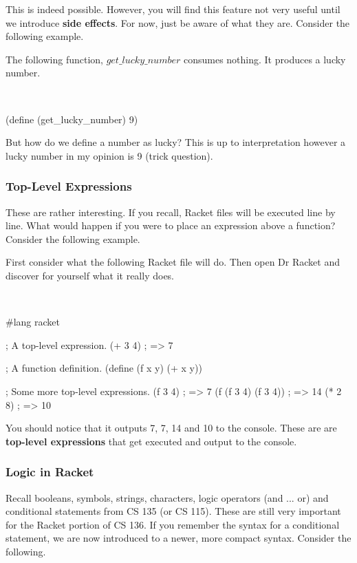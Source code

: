 \documentclass[11pt, twoside, exarticle]{article}
\newcommand{\exbox}[2] {
	\setlength{\fboxsep}{8pt}
	\marginpar {
		\vspace{0.9em}
		\footnotesize{\textbf{\color{darkpurple}EXAMPLE #1}}
	}
	\colorbox{lightpurple}{
		\begin{varwidth}{\dimexpr\linewidth-2\fboxsep}
		#2
		\end{varwidth}
	}
	~\\
}
\begin{document}
This is indeed possible. However, you will find this feature not very useful until we introduce \textbf{side effects}. For now, just be aware of what they are. Consider the following example.\\

\exbox{3}{The following function, $get\_lucky\_number$ consumes nothing. It produces a lucky number.}

\begin{code}[Lisp]
(define (get_lucky_number)
	9)
\end{code}

But how do we define a number as lucky? This is up to interpretation however a lucky number in my opinion is 9 (trick question).

\subsubsection*{Top-Level Expressions}

These are rather interesting. If you recall, Racket files will be executed line by line. What would happen if you were to place an expression above a function? Consider the following example.\\

\exbox{4}{First consider what the following Racket file will do. Then open Dr Racket and discover for yourself what it really does.}

\begin{code}[Lisp]
#lang racket

; A top-level expression.
(+ 3 4) ; => 7

; A function definition.
(define (f x y)
	(+ x y))

; Some more top-level expressions.
(f 3 4) ; => 7
(f (f 3 4) (f 3 4)) ; => 14
(* 2 8) ; => 10
\end{code}

You should notice that it outputs 7, 7, 14 and 10 to the console. These are are \textbf{top-level expressions} that get executed and output to the console.

\subsubsection*{Logic in Racket}

Recall booleans, symbols, strings, characters, logic operators (and ... or) and conditional statements from CS 135 (or CS 115). These are still very important for the Racket portion of CS 136. If you remember the syntax for a conditional statement, we are now introduced to a newer, more compact syntax. Consider the following.\\
\end{document}
